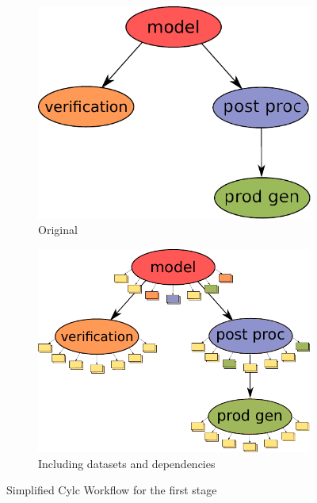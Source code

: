 \documentclass[a4paper]{article}
\begin{document}
\begin{figure}[H]
  \begin{subfigure}{0.45\textwidth}
    \centering
    \includegraphics[width=\columnwidth]{cycle1}
    \caption{Original}
    \label{fig:cycle1}
  \end{subfigure}
  \qquad
  \begin{subfigure}{0.45\textwidth}
    \centering
    \includegraphics[width=\columnwidth]{cycle-io-dep}
    \caption{Including datasets and dependencies}
    \label{fig:cycle-io-dep}
  \end{subfigure}

  \caption{Simplified Cylc Workflow for the first stage}
\end{figure}
\end{document}
